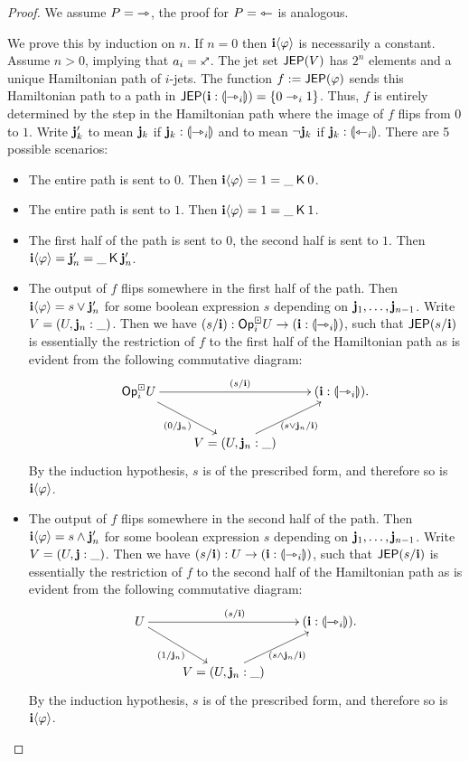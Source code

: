 \documentclass[a4paper]{memoir}
\begin{document}
\begin{proof}
	We assume $P = {\rightarrowtriangle}$, the proof for $P = {\leftarrowtriangle}$ is analogous.

	We prove this by induction on $n$.
	If $n = 0$ then $\mathbf{i} \langle \varphi \rangle$ is necessarily a constant.
	Assume $n > 0$, implying that $a_i = \ypolar$.
	The jet set $\mathsf{JEP}(V)$ has $2^n$ elements and a unique Hamiltonian path of $i$-jets.
	The function $f := \mathsf{JEP}(\varphi)$ sends this Hamiltonian path to a path in $\mathsf{JEP}(\mathbf{i} : {\llparenthesis \rightarrowtriangle_i \rrparenthesis}) = \mathopen{}\left\{ 0 \rightarrowtriangle_i 1 \right\}\mathclose{}$.
	Thus, $f$ is entirely determined by the step in the Hamiltonian path where the image of $f$ flips from $0$ to $1$.
	Write $\mathbf{j}_k'$ to mean $\mathbf{j}_k$ if $\mathbf{j}_k : {\llparenthesis \rightarrowtriangle_i \rrparenthesis}$ and to mean $\lnot \mathbf{j}_k$ if $\mathbf{j}_k : {\llparenthesis \leftarrowtriangle_i \rrparenthesis}$.
	There are 5 possible scenarios:
	\begin{itemize}
		\item The entire path is sent to $0$. Then $\mathbf{i} \langle \varphi \rangle = 1 = \_ \mathbin{\mathsf{K}} 0$.
		\item The entire path is sent to $1$. Then $\mathbf{i} \langle \varphi \rangle = 1 = \_ \mathbin{\mathsf{K}} 1$.
		\item The first half of the path is sent to $0$, the second half is sent to $1$. Then $\mathbf{i} \langle \varphi \rangle = \mathbf{j}_n' = \_ \mathbin{\mathsf{K}} \mathbf{j}_n'$.
		\item The output of $f$ flips somewhere in the first half of the path.
		Then $\mathbf{i} \langle \varphi \rangle = s \vee \mathbf{j}_n'$ for some boolean expression $s$ depending on $\mathbf{j}_1, \ldots, \mathbf{j}_{n-1}$.
		Write $V = (U, \mathbf{j}_n : \_)$.
		Then we have $(s/\mathbf{i}) : {\mathsf{Op}}^\boxdot_i U \to (\mathbf{i} : {\llparenthesis \rightarrowtriangle_i \rrparenthesis})$, such that $\mathsf{JEP}(s/\mathbf{i})$ is essentially the restriction of $f$ to the first half of the Hamiltonian path as is evident from the following commutative diagram:
		\[
			\xymatrix{
				\Opcube_i U
					\ar[rr]^{(s/\dm i)}
					\ar[rd]_{(0/\dm j_n)}
				&&
				(\dm i : \rival{\jet_i}).
				\\
				& V = (U, \dm j_n : \_)
					\ar[ru]_{(s \vee \dm j_n / \dm i)}
			}
		\]
		By the induction hypothesis, $s$ is of the prescribed form, and therefore so is $\mathbf{i} \langle \varphi \rangle$.
		\item The output of $f$ flips somewhere in the second half of the path.
		Then $\mathbf{i} \langle \varphi \rangle = s \wedge \mathbf{j}_n'$ for some boolean expression $s$ depending on $\mathbf{j}_1, \ldots, \mathbf{j}_{n-1}$.
		Write $V = (U, \mathbf{j} : \_)$.
		Then we have $(s/\mathbf{i}) : U \to (\mathbf{i} : {\llparenthesis \rightarrowtriangle_i \rrparenthesis})$, such that $\mathsf{JEP}(s/\mathbf{i})$ is essentially the restriction of $f$ to the second half of the Hamiltonian path as is evident from the following commutative diagram:
		\[
			\xymatrix{
				U
					\ar[rr]^{(s/\dm i)}
					\ar[rd]_{(1/\dm j_n)}
				&&
				(\dm i : \rival{\jet_i}).
				\\
				& V = (U, \dm j_n : \_)
					\ar[ru]_{(s \wedge \dm j_n / \dm i)}
			}
		\]
		By the induction hypothesis, $s$ is of the prescribed form, and therefore so is $\mathbf{i} \langle \varphi \rangle$. \qedhere
	\end{itemize}
\end{proof}
\end{document}
